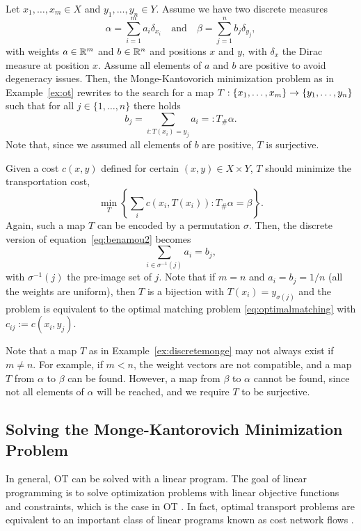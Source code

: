 \begin{example}
	Let $x_1, \dots, x_m \in X$ and $y_1, \dots, y_n \in Y$. Assume we have two discrete measures 
	\begin{equation*}
		\alpha = \sum_{i=1}^m a_i \delta_{x_i} \quad \text{and} \quad \beta = \sum_{j=1}^n b_j \delta_{y_j},
	\end{equation*}
	with weights $a\in \mathbb{R}^m$ and $b \in \mathbb{R}^n$ and positions $x$ and $y$, with $\delta_x$ the Dirac measure at position $x$. Assume all elements of $a$ and $b$ are positive to avoid degeneracy issues. Then, the Monge-Kantovorich minimization problem as in Example~\ref{ex:ot} rewrites to the search for a map $T: \{x_1, \dots, x_m\} \rightarrow \{y_1, \dots, y_n\}$ such that for all $j \in \{1, \dots, n\}$ there holds 
	\[b_j = \sum_{i: T(x_i) = y_j} a_i =: T_\# \alpha. \]
	Note that, since we assumed all elements of $b$ are positive, $T$ is surjective. \par 
	Given a cost $c(x,y)$ defined for certain $(x,y) \in X \times Y$, $T$ should minimize the transportation cost, 
	\[\min_T \left\{ \sum_i c(x_i, T(x_i)): T_\#\alpha = \beta \right\}. \]
	Again, such a map $T$ can be encoded by a permutation $\sigma$. Then, the discrete version of equation~\eqref{eq:benamou2} becomes 
	\begin{equation*}
		\sum_{i \in \sigma^{-1}(j)} a_i = b_j,
	\end{equation*}
	with $\sigma^{-1}(j)$ the pre-image set of $j$. Note that if $m=n$ and $a_i = b_j = 1/n$ (all the weights are uniform), then $T$ is a bijection with $T(x_i) = y_{\sigma(j)}$ and the problem is equivalent to the optimal matching problem \eqref{eq:optimalmatching} with $c_{ij} := c(x_i, y_j)$. 
	\label{ex:discretemonge}
\end{example}
\vspace{0.3cm}
\begin{remark}[Existence]
	Note that a map $T$ as in Example~\ref{ex:discretemonge} may not always exist if $m\neq n$. For example, if $m < n$, the weight vectors are not compatible, and a map $T$ from $\alpha$ to $\beta$ can be found. However, a map from $\beta$ to $\alpha$ cannot be found, since not all elements of $\alpha$ will be reached, and we require $T$ to be surjective.
\end{remark}


\subsection{Solving the Monge-Kantorovich Minimization Problem}
In general, OT can be solved with a linear program. The goal of linear programming is to solve optimization problems with linear objective functions and constraints, which is the case in OT \citep{peyre2020}. In fact, optimal transport problems are equivalent to an important class of linear programs known as cost network flows \citep{korte2018, ford1962}. \par 

